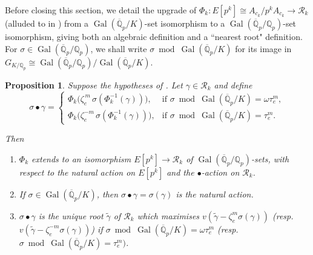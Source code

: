\documentclass{amsart}
\newcommand{\Qp}{\mathbb{Q}_p}
\newcommand{\Qpbar}{\overline{\mathbb{Q}}_p}
\newtheorem{proposition}[theorem]{Proposition}
\theoremstyle{definition}
\newcommand{\Q}{\mathbb{Q}}
\newcommand{\Gal}{\operatorname{Gal}}
\numberwithin{theorem}{section}
\numberwithin{equation}{section}
\begin{document}
Before closing this section, we detail the upgrade of $\Phi_k: E[p^k] \cong A_{c_k}/p^kA_{c_k} \rightarrow \mathcal{R}_k$ (alluded to in ) from a $\Gal(\Qpbar/K)$-set isomorphism to a $\Gal(\Qpbar/\Qp)$-set isomorphism, giving both an algebraic definition and a ``nearest root" definition. For $\sigma \in \Gal(\Qpbar/\Qp)$, we shall write $ \sigma \bmod{\Gal(\Qpbar/K)}$ for its image in $G_{K/\Qp} \cong \Gal(\Qpbar/\Qp)/\Gal(\Qpbar/K)$.

\begin{proposition}\label{rmk: twisted Galois action 2}
Suppose the hypotheses of . Let $\gamma \in \mathcal{R}_k$ and define
\[
\sigma \bullet \gamma = \begin{cases}
\Phi_k\!\big( \zeta_e^{\,m}\, \sigma(\Phi_k^{-1}(\gamma)) \big), & \text{if } \sigma \bmod \Gal(\overline{\Q}_p/K) = \omega \tau_e^{m},\\[4pt]
\Phi_k\!\big( \zeta_e^{-m}\, \sigma(\Phi_k^{-1}(\gamma)) \big), & \text{if } \sigma \bmod \Gal(\overline{\Q}_p/K) = \tau_e^{m}.
\end{cases}
\]

Then 
\begin{enumerate}
    \item $\Phi_k$ extends to an isomorphism $E[p^k] \rightarrow \mathcal{R}_k$ of $\Gal(\Qpbar/\Qp)$-sets, with respect to the natural action on $E[p^k]$ and the $\bullet$-action on $\mathcal{R}_k$.
    \item If $\sigma \in \Gal(\Qpbar/K)$, then $\sigma \bullet \gamma = \sigma(\gamma)$ is the natural action.
    \item $\sigma \bullet \gamma$ is the unique root $\tilde{\gamma}$ of $\mathcal{R}_k$ which maximises $v(\tilde{\gamma}-\zeta_e^m \sigma(\gamma))$ (resp.~$v(\tilde{\gamma}-\zeta_e^{-m} \sigma(\gamma))$) if $\sigma \bmod{\Gal(\Qpbar/K)} = \omega\tau_e^m$ (resp.~$\sigma \bmod{\Gal(\Qpbar/K)} = \tau_e^m)$.
    \end{enumerate}
\end{proposition}
\end{document}
